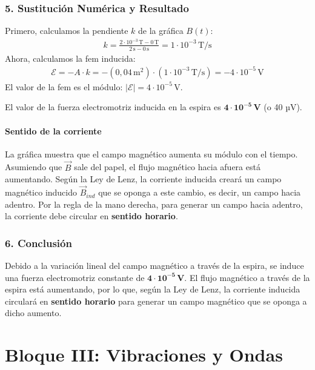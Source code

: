 \subsubsection*{5. Sustitución Numérica y Resultado}
Primero, calculamos la pendiente $k$ de la gráfica $B(t)$:
\begin{gather}
    k = \frac{2 \cdot 10^{-3} \, \text{T} - 0 \, \text{T}}{2 \, \text{s} - 0 \, \text{s}} = 1 \cdot 10^{-3} \, \text{T/s}
\end{gather}
Ahora, calculamos la fem inducida:
\begin{gather}
    \mathcal{E} = -A \cdot k = -(0,04 \, \text{m}^2) \cdot (1 \cdot 10^{-3} \, \text{T/s}) = -4 \cdot 10^{-5} \, \text{V}
\end{gather}
El valor de la fem es el módulo: $|\mathcal{E}| = 4 \cdot 10^{-5} \, \text{V}$.
\begin{cajaresultado}
    El valor de la fuerza electromotriz inducida en la espira es $\boldsymbol{4 \cdot 10^{-5} \, \textbf{V}}$ (o 40 µV).
\end{cajaresultado}
\medskip
\paragraph*{Sentido de la corriente}
La gráfica muestra que el campo magnético aumenta su módulo con el tiempo. Asumiendo que $\vec{B}$ sale del papel, el flujo magnético hacia afuera está aumentando. Según la Ley de Lenz, la corriente inducida creará un campo magnético inducido $\vec{B}_{ind}$ que se oponga a este cambio, es decir, un campo hacia adentro. Por la regla de la mano derecha, para generar un campo hacia adentro, la corriente debe circular en \textbf{sentido horario}.

\subsubsection*{6. Conclusión}
\begin{cajaconclusion}
Debido a la variación lineal del campo magnético a través de la espira, se induce una fuerza electromotriz constante de $\mathbf{4 \cdot 10^{-5} \, V}$. El flujo magnético a través de la espira está aumentando, por lo que, según la Ley de Lenz, la corriente inducida circulará en \textbf{sentido horario} para generar un campo magnético que se oponga a dicho aumento.
\end{cajaconclusion}
\newpage

\section{Bloque III: Vibraciones y Ondas}
\label{sec:ondas_2025_jun_ord}

